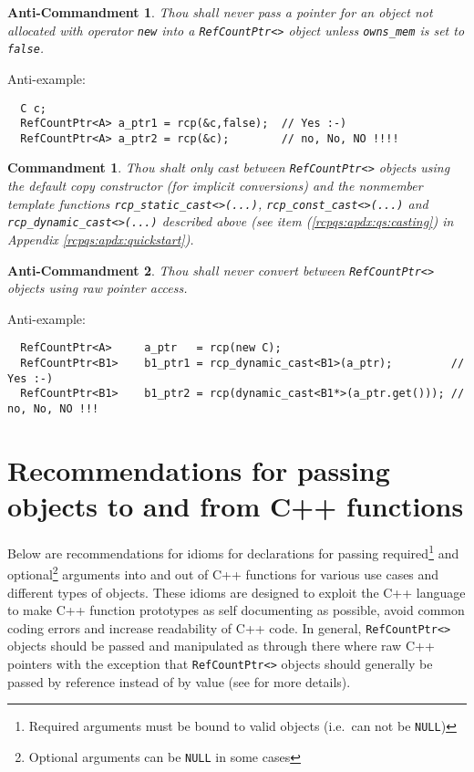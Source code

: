 \documentclass[pdf,ps2pdf,11pt]{SANDreport}
\newtheorem{commandment}{Commandment}
\newtheorem{anticommandment}{Anti-Commandment}
\begin{document}
\begin{anticommandment}
Thou shall never pass a pointer for an object not allocated with
operator {}\texttt{new} into a {}\texttt{Ref\-Count\-Ptr<>} object unless
{}\texttt{owns\_mem} is set to {}\texttt{false}.
\end{anticommandment}

{}\noindent{}Anti-example:
{\small\begin{verbatim}
  C c;
  RefCountPtr<A> a_ptr1 = rcp(&c,false);  // Yes :-)
  RefCountPtr<A> a_ptr2 = rcp(&c);        // no, No, NO !!!!
\end{verbatim}}

\begin{commandment}\label{rcp:cmnd:converstion}
Thou shalt only cast between {}\texttt{Ref\-Count\-Ptr<>} objects using
the default copy constructor (for implicit conversions) and the
nonmember template functions
{}\texttt{rcp\-\_static\-\_cast<>(\-...)},
{}\texttt{rcp\-\_const\-\_cast<>(\-...)} and
{}\texttt{rcp\-\_dynamic\-\_cast<>(\-...)}  described above (see item
({}\ref{rcpqs:apdx:qs:casting}) in Appendix
{}\ref{rcpqs:apdx:quickstart}).
\end{commandment}

\begin{anticommandment}
Thou shall never convert between {}\texttt{Ref\-Count\-Ptr<>} objects
using raw pointer access.
\end{anticommandment}

{}\noindent{}Anti-example:
{\small\begin{verbatim}
  RefCountPtr<A>     a_ptr   = rcp(new C);
  RefCountPtr<B1>    b1_ptr1 = rcp_dynamic_cast<B1>(a_ptr);         // Yes :-)
  RefCountPtr<B1>    b1_ptr2 = rcp(dynamic_cast<B1*>(a_ptr.get())); // no, No, NO !!!
\end{verbatim}}

%
\section{Recommendations for passing objects to and from C++ functions}
\label{rcpqs:apdx:passing-args}
%

Below are recommendations for idioms for declarations for passing
required\footnote{Required arguments must be bound to valid objects
(i.e.~can not be {}\texttt{NULL})} and optional\footnote{Optional
arguments can be {}\texttt{NULL} in some cases} arguments into and out
of C++ functions for various use cases and different types of objects.
These idioms are designed to exploit the C++ language to make C++
function prototypes as self documenting as possible, avoid common
coding errors and increase readability of C++ code.  In general,
{}\texttt{Ref\-Count\-Ptr<>} objects should be passed and manipulated
as through there where raw C++ pointers with the exception that
{}\texttt{Ref\-Count\-Ptr<>} objects should generally be passed by
reference instead of by value (see {}\cite{ref:RefCountPtr} for more
details).
\end{document}
